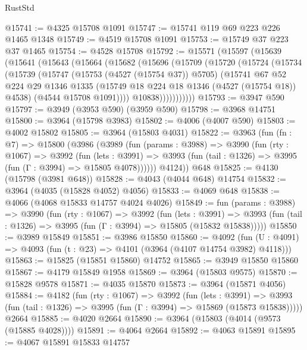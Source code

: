 \begin{lexlean}{RustStd}
\begin{coremodule}
{\begin{coremodule}
{{{{{{{{{{{{{{{{{{{{{{{{{{{{{{{{{{{{{{@15741 := @4325 @15708 @1091
@15747 := @15741 @119 @69 @223 @226 @1465 @1348
@15749 := @4519 @15708 @1091
@15753 := @15749 @37 @223 @37 @1465
@15754 := @4528 @15708
@15792 := @15571
    (@15597
      (@15639
        (@15641
          (@15643
            (@15664
              (@15682
                (@15696
                  (@15709
                    (@15720
                      (@15724
                        (@15734
                          (@15739
                            (@15747
                              (@15753 (@4527 (@15754 @37)) @5705)
                              (@15741
                                @67
                                @52
                                @224
                                @29
                                @1346
                                @1335
                                (@15749 @18 @224 @18 @1346 (@4527 (@15754 @18)) @4538)
                                (@4544 @15708 @1091))))
                          @10838)))))))))))
@15793 := @3947 @590
@15797 := @3949 (@3953 @590) (@3959 @590)
@15798 := @3968 @14751
@15800 := @3964 (@15798 @3983)
@15802 := @4006 (@4007 @590)
@15803 := @4002 @15802
@15805 := @3964 (@15803 @4031)
@15822 := @3963
    (fun (fn : @7) =>
    @15800
      (@3986
        (@3989
          (fun (params : @3988) =>
          @3990
            (fun (rty : @1067) =>
            @3992
              (fun (lets : @3991) =>
              @3993 (fun (tail : @1326) => @3995 (fun (Γ : @3994) => @15805 @4078))))))
        @4124))
    @648
@15825 := @4130 (@15798 (@3981 @648))
@15828 := @4043 (@4044 @648) @14754
@15832 := @3964 (@4035 (@15828 @4052) @4056)
@15833 := @4069 @648
@15838 := @4066 (@4068 @15833 @14757 @4024 @4026)
@15849 := fun (params : @3988) =>
  @3990
    (fun (rty : @1067) =>
    @3992
      (fun (lets : @3991) =>
      @3993 (fun (tail : @1326) => @3995 (fun (Γ : @3994) => @15805 (@15832 @15838)))))
@15850 := @3989 @15849
@15851 := @3986 @15850
@15860 := @4092
    (fun (U : @4091) => @4093 (fun (t : @23) => @4101 (@3964 (@4107 @14754 @3982) @4118)))
@15863 := @15825 (@15851 @15860) @14752
@15865 := @3949 @15850 @15860
@15867 := @4179 @15849 @1958
@15869 := @3964 (@15803 @9575)
@15870 := @15828 @9578
@15871 := @4035 @15870
@15873 := @3964 (@15871 @4056)
@15884 := @4182
    (fun (rty : @1067) =>
    @3992
      (fun (lets : @3991) =>
      @3993 (fun (tail : @1326) => @3995 (fun (Γ : @3994) => @15869 (@15873 @15838)))))
    @2664
@15885 := @4020 @2664
@15890 := @3964 (@15803 (@4014 (@9573 (@15885 @4028))))
@15891 := @4064 @2664
@15892 := @4063 @15891
@15895 := @4067 @15891 @15833 @14757
}}}}}}}}}}}}}}}}}}}}}}}}}}}}}}}}}}}}}}
\end{coremodule}}
\end{coremodule}
\end{lexlean}
